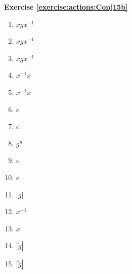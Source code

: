 \noindent\textbf{Exercise \ref{exercise:actions:Conj15b}}
%
\begin{multicols}{4}
\begin{enumerate}
\item
$xgx^{-1}$

\item
$xgx^{-1}$

\item
$xgx^{-1}$

\item
$x^{-1}x$

\item
$x^{-1}x$

\item
$e$

\item
$e$

\item
$g^n$

\item
$e$

\item
$e$

\item
$|g|$

\item
$x^{-1}$

\item
$x$

\item
$|\tilde{g}|$

\item
$|\tilde{g}|$
\end{enumerate}
\end{multicols}

